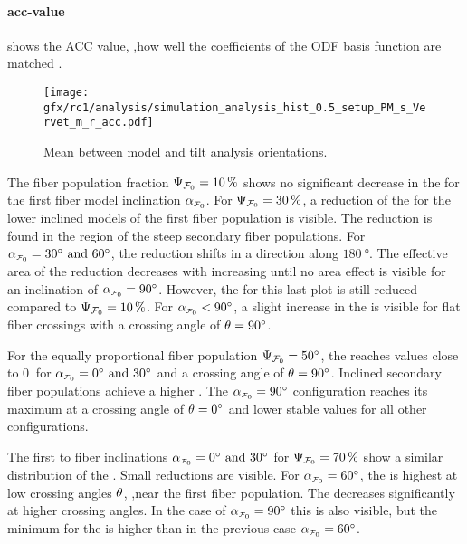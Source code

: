 \paragraph{acc-value}
% 
 shows the  \ac{ACC} value, \ie{},how well the coefficients of the \ac{ODF} basis function are matched \cite{Schilling2018}.
\par
%
\begin{figure}[!p]
\centering
\texttt{[image: gfx/rc1/analysis/simulation\_analysis\_hist\_0.5\_setup\_PM\_s\_Vervet\_m\_r\_acc.pdf]}
\caption{Mean \accvalue{} between model and tilt analysis orientations.}
\label{fig:sim_ana_acc}
\end{figure}
% 
The fiber population fraction $\textnormal{$\Psi_{\textnormal{$\mathcal{F}_0$}}$}=\SI{10}{\percent}$ shows no significant decrease in the \accvalue{} for the first fiber model inclination $\modelInc$.
For $\textnormal{$\Psi_{\textnormal{$\mathcal{F}_0$}}$}=\SI{30}{\percent}$, a reduction of the \accvalue{} for the lower inclined models of the first fiber population is visible.
The reduction is found in the region of the steep secondary fiber populations.
For $\modelInc = \SIlist{30;60}{\degree}$, the reduction shifts in a direction along $\SI{180}{\degree}$.
The effective area of the reduction decreases with increasing \modelInc{} until no area effect is visible for an inclination of $\modelInc=\SI{90}{\degree}$.
However, the \accvalue{} for this last plot is still reduced compared to $\textnormal{$\Psi_{\textnormal{$\mathcal{F}_0$}}$}=\SI{10}{\percent}$.
For $\modelInc < \SI{90}{\degree}$, a slight increase in the \accvalue{} is visible for flat fiber crossings with a crossing angle of $\textnormal{$\theta$}=\SI{90}{\degree}$.
\par
%
For the equally proportional fiber population $\textnormal{$\Psi_{\textnormal{$\mathcal{F}_0$}}$} = \SI{50}{\degree}$, the \accvalue{} reaches values close to $\SI{0}{}$ for $\modelInc = \SIlist{0;30}{\degree}$ and a crossing angle of $\textnormal{$\theta$}=\SI{90}{\degree}$.
Inclined secondary fiber populations achieve a higher \accvalue{}.
The $\modelInc = \SI{90}{\degree}$ configuration reaches its maximum \accvalue{} at a crossing angle of $\textnormal{$\theta$}=\SI{0}{\degree}$ and lower stable values for all other configurations.
\par
%
The first to fiber inclinations $\modelInc = \SIlist{0;30}{\degree}$ for $\textnormal{$\Psi_{\textnormal{$\mathcal{F}_0$}}$}=\SI{70}{\percent}$ show a similar distribution of the \accvalue{}. 
Small reductions are visible.
For $\modelInc=\SI{60}{\degree}$, the \accvalue{} is highest at low crossing angles $\textnormal{$\theta$}$, \ie{},near the first fiber population.
The \accvalue{} decreases significantly at higher crossing angles.
In the case of $\modelInc=\SI{90}{\degree}$ this is also visible, but the minimum for the \accvalue{} is higher than in the previous case $\modelInc=\SI{60}{\degree}$.
